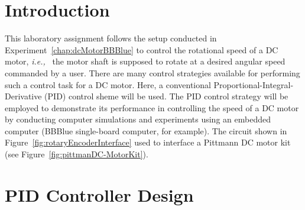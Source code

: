 


\section{Introduction}
\label{sec:introductionPID}
This laboratory assignment follows the setup conducted in Experiment~\ref{chap:dcMotorBBBlue} to control the rotational speed of a DC motor, \textit{i.e.,~} the motor shaft is supposed to rotate at a desired angular speed commanded by a user. There are many control strategies available for performing such a control task for a DC motor. Here, a conventional Proportional-Integral-Derivative (PID) control sheme will be used. The PID control strategy will be employed to demonstrate its performance in controlling the speed of  a DC motor by  conducting computer simulations and experiments using an embedded computer (BBBlue single-board computer, for example). The circuit shown in Figure~\ref{fig:rotaryEncoderInterface}  used to interface a Pittmann DC motor kit (see Figure~\ref{fig:pittmanDC-MotorKit}).    




\section{PID Controller Design}
\label{sec:pidControllerDesign}

